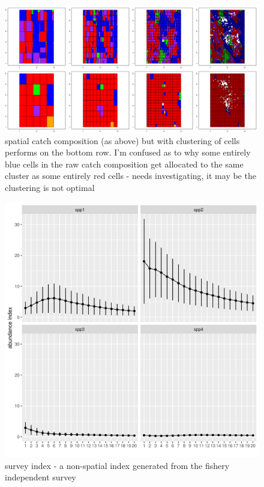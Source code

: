 \documentclass[review]{elsarticle}
\begin{document}
\begin{figure}[!ht]
	\includegraphics[width = \linewidth]{../tests/plots/catch_comp_clusters}
	\caption{spatial catch composition (as above) but with clustering of
		cells performs on the bottom row. I'm confused as to why some
		entirely blue cells in the raw catch composition get allocated
	to the same cluster as some entirely red cells - needs investigating,
	it may be the clustering is not optimal}
	\label{fig:9}
\end{figure}	

\begin{figure}[!ht]
	\includegraphics[width = \linewidth]{../tests/plots/survey_index}
	\caption{survey index - a non-spatial index generated from the fishery independent
	survey}
	\label{fig:10}
\end{figure}	
\end{document}

